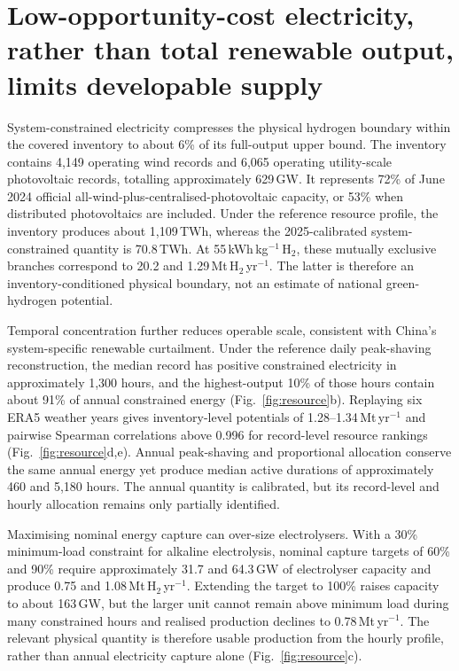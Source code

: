 \documentclass[pdflatex,sn-nature]{sn-jnl}
\begin{document}
\section*{Low-opportunity-cost electricity, rather than total renewable output, limits developable supply}

System-constrained electricity compresses the physical hydrogen boundary within the covered inventory to about 6\% of its full-output upper bound. The inventory contains 4,149 operating wind records and 6,065 operating utility-scale photovoltaic records, totalling approximately 629\,GW. It represents 72\% of June 2024 official all-wind-plus-centralised-photovoltaic capacity, or 53\% when distributed photovoltaics are included. Under the reference resource profile, the inventory produces about 1,109\,TWh, whereas the 2025-calibrated system-constrained quantity is 70.8\,TWh. At 55\,kWh\,kg$^{-1}$\,H$_2$, these mutually exclusive branches correspond to 20.2 and 1.29\,Mt\,H$_2$\,yr$^{-1}$. The latter is therefore an inventory-conditioned physical boundary, not an estimate of national green-hydrogen potential.

Temporal concentration further reduces operable scale, consistent with China's system-specific renewable curtailment\cite{guo2023grid}. Under the reference daily peak-shaving reconstruction, the median record has positive constrained electricity in approximately 1,300 hours, and the highest-output 10\% of those hours contain about 91\% of annual constrained energy (Fig.~\ref{fig:resource}b). Replaying six ERA5 weather years gives inventory-level potentials of 1.28--1.34\,Mt\,yr$^{-1}$ and pairwise Spearman correlations above 0.996 for record-level resource rankings (Fig.~\ref{fig:resource}d,e). Annual peak-shaving and proportional allocation conserve the same annual energy yet produce median active durations of approximately 460 and 5,180 hours. The annual quantity is calibrated, but its record-level and hourly allocation remains only partially identified.

Maximising nominal energy capture can over-size electrolysers. With a 30\% minimum-load constraint for alkaline electrolysis, nominal capture targets of 60\% and 90\% require approximately 31.7 and 64.3\,GW of electrolyser capacity and produce 0.75 and 1.08\,Mt\,H$_2$\,yr$^{-1}$. Extending the target to 100\% raises capacity to about 163\,GW, but the larger unit cannot remain above minimum load during many constrained hours and realised production declines to 0.78\,Mt\,yr$^{-1}$. The relevant physical quantity is therefore usable production from the hourly profile, rather than annual electricity capture alone (Fig.~\ref{fig:resource}c).
\end{document}
